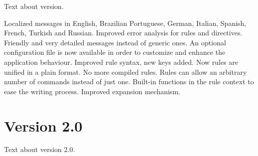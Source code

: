 \documentclass[a4paper,twoside,12pt]{memoir}
\begin{document}
Text about version.


\begin{changelog}\small
\newfeature Localized messages in English, Brazilian Portuguese, German, Italian, Spanish, French, Turkish and Russian.
\bugfix Improved error analysis for rules and directives.
\newfeature Friendly and very detailed messages instead of generic ones.
\newfeature An optional configuration file is now available in order to customize and enhance the application behaviour.
\bugfix Improved rule syntax, new keys added.
\newfeature Now rules are unified in a plain format. No more compiled rules.
\newfeature Rules can allow an arbitrary number of commands instead of just one.
\newfeature Built-in functions in the rule context to ease the writing process.
\bugfix Improved expansion mechanism.
\end{changelog}

%
%
\section*{Version 2.0}

Text about version 2.0.
\end{document}
